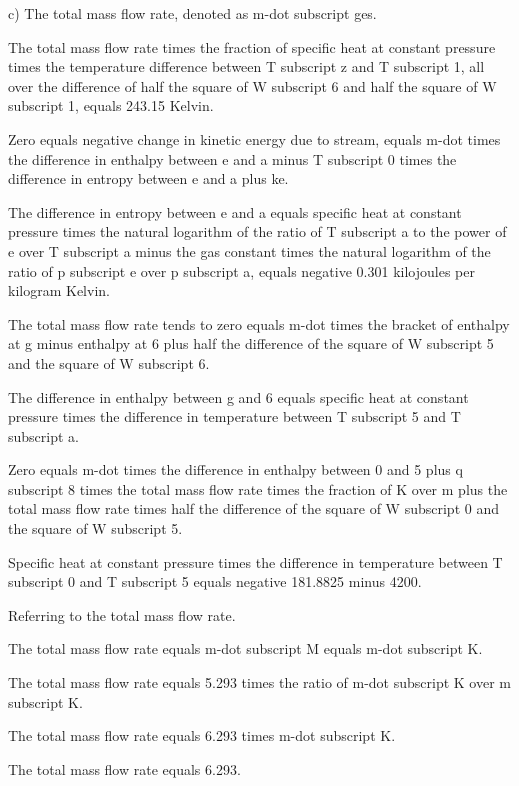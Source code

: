 c) The total mass flow rate, denoted as m-dot subscript ges.

The total mass flow rate times the fraction of specific heat at constant pressure times the temperature difference between T subscript z and T subscript 1, all over the difference of half the square of W subscript 6 and half the square of W subscript 1, equals 243.15 Kelvin.

Zero equals negative change in kinetic energy due to stream, equals m-dot times the difference in enthalpy between e and a minus T subscript 0 times the difference in entropy between e and a plus ke.

The difference in entropy between e and a equals specific heat at constant pressure times the natural logarithm of the ratio of T subscript a to the power of e over T subscript a minus the gas constant times the natural logarithm of the ratio of p subscript e over p subscript a, equals negative 0.301 kilojoules per kilogram Kelvin.

The total mass flow rate tends to zero equals m-dot times the bracket of enthalpy at g minus enthalpy at 6 plus half the difference of the square of W subscript 5 and the square of W subscript 6.

The difference in enthalpy between g and 6 equals specific heat at constant pressure times the difference in temperature between T subscript 5 and T subscript a.

Zero equals m-dot times the difference in enthalpy between 0 and 5 plus q subscript 8 times the total mass flow rate times the fraction of K over m plus the total mass flow rate times half the difference of the square of W subscript 0 and the square of W subscript 5.

Specific heat at constant pressure times the difference in temperature between T subscript 0 and T subscript 5 equals negative 181.8825 minus 4200.

Referring to the total mass flow rate.

The total mass flow rate equals m-dot subscript M equals m-dot subscript K.

The total mass flow rate equals 5.293 times the ratio of m-dot subscript K over m subscript K.

The total mass flow rate equals 6.293 times m-dot subscript K.

The total mass flow rate equals 6.293.
